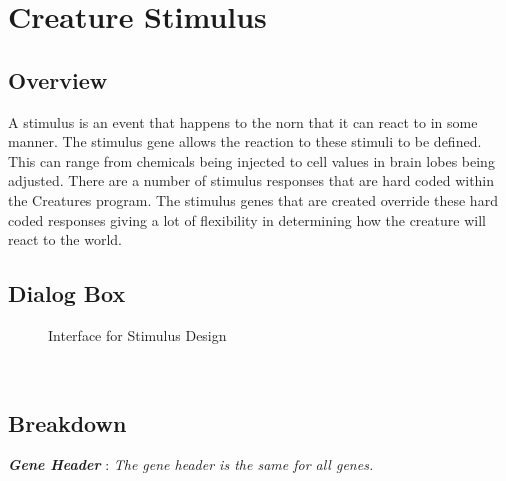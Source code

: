 \documentclass[11pt,twoside,a4paper]{article}
\begin{document}
\section{Creature Stimulus} %
\begin{minipage}{0.5\linewidth}
\subsection{Overview}
A stimulus is an event that happens to the norn that it can react to in some manner. The stimulus gene allows the reaction to these stimuli to be defined. This can range from chemicals being injected to cell values in brain lobes being adjusted. There are a number of stimulus responses that are hard coded within the Creatures program. The stimulus genes that are created override these hard coded responses giving a lot of flexibility in determining how the creature will react to the world.~\\
\end{minipage}
\begin{minipage}{0.1\linewidth}\end{minipage}
\begin{minipage}{0.4\linewidth}
\subsection{Dialog Box}
\begin{figure}[H]
	\centerline {} %
	\caption{Interface for Stimulus Design}
	\label{fig:genes_stimulus}
\end{figure}
\end{minipage}~\\

\clearpage

\subsection{Breakdown}

\textbf{\textit{Gene Header}} : \emph{The gene header is the same for all genes.}~\\
\end{document}
